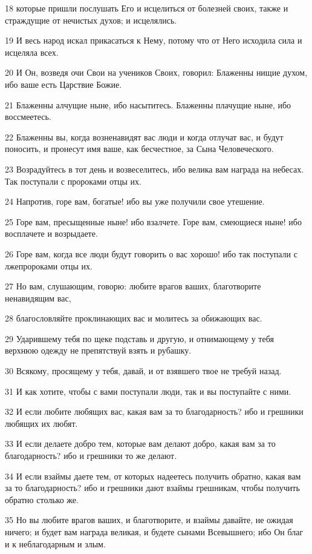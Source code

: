 \par 18 которые пришли послушать Его и исцелиться от болезней своих, также и страждущие от нечистых духов; и исцелялись.
\par 19 И весь народ искал прикасаться к Нему, потому что от Него исходила сила и исцеляла всех.
\par 20 И Он, возведя очи Свои на учеников Своих, говорил: Блаженны нищие духом, ибо ваше есть Царствие Божие.
\par 21 Блаженны алчущие ныне, ибо насытитесь. Блаженны плачущие ныне, ибо воссмеетесь.
\par 22 Блаженны вы, когда возненавидят вас люди и когда отлучат вас, и будут поносить, и пронесут имя ваше, как бесчестное, за Сына Человеческого.
\par 23 Возрадуйтесь в тот день и возвеселитесь, ибо велика вам награда на небесах. Так поступали с пророками отцы их.
\par 24 Напротив, горе вам, богатые! ибо вы уже получили свое утешение.
\par 25 Горе вам, пресыщенные ныне! ибо взалчете. Горе вам, смеющиеся ныне! ибо восплачете и возрыдаете.
\par 26 Горе вам, когда все люди будут говорить о вас хорошо! ибо так поступали с лжепророками отцы их.
\par 27 Но вам, слушающим, говорю: любите врагов ваших, благотворите ненавидящим вас,
\par 28 благословляйте проклинающих вас и молитесь за обижающих вас.
\par 29 Ударившему тебя по щеке подставь и другую, и отнимающему у тебя верхнюю одежду не препятствуй взять и рубашку.
\par 30 Всякому, просящему у тебя, давай, и от взявшего твое не требуй назад.
\par 31 И как хотите, чтобы с вами поступали люди, так и вы поступайте с ними.
\par 32 И если любите любящих вас, какая вам за то благодарность? ибо и грешники любящих их любят.
\par 33 И если делаете добро тем, которые вам делают добро, какая вам за то благодарность? ибо и грешники то же делают.
\par 34 И если взаймы даете тем, от которых надеетесь получить обратно, какая вам за то благодарность? ибо и грешники дают взаймы грешникам, чтобы получить обратно столько же.
\par 35 Но вы любите врагов ваших, и благотворите, и взаймы давайте, не ожидая ничего; и будет вам награда великая, и будете сынами Всевышнего; ибо Он благ и к неблагодарным и злым.
